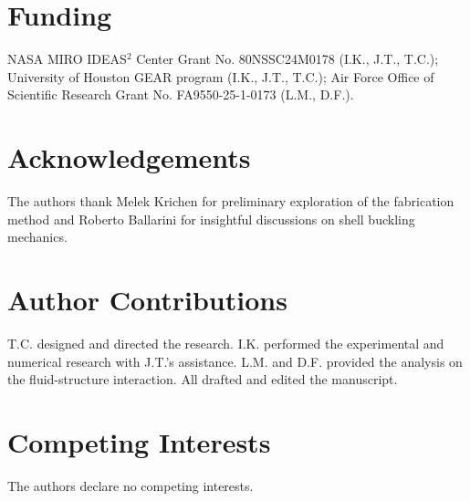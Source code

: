 \documentclass[twocolumn,letter,11pt]{article}
\begin{document}
\section*{Funding}
NASA MIRO IDEAS$^2$ Center Grant No. 80NSSC24M0178 (I.K., J.T., T.C.); University of Houston GEAR program (I.K., J.T., T.C.); Air Force Office of Scientific Research Grant No. FA9550-25-1-0173 (L.M., D.F.).

\section*{Acknowledgements}
The authors thank Melek Krichen for preliminary exploration of the fabrication method and Roberto Ballarini for insightful discussions on shell buckling mechanics. 

\section*{Author Contributions} T.C. designed and directed the research. I.K. performed the experimental and numerical research with J.T.'s assistance. L.M. and D.F. provided the analysis on the fluid-structure interaction. All drafted and edited the manuscript.

\section*{Competing Interests} The authors declare no competing interests.
\end{document}
